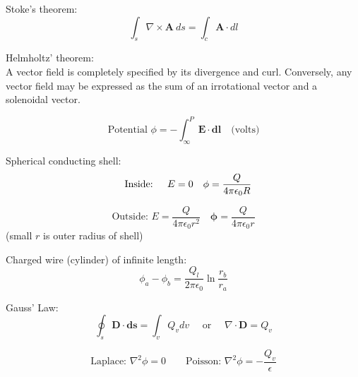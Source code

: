 \documentclass[a4paper]{article}
\begin{document}
{\large Stoke's theorem:}
\begin{displaymath}
\int_s \nabla \times \mathbf A \ ds = \int_c \mathbf A \cdot dl
\end{displaymath}


{\large Helmholtz' theorem: }\\
A vector field is completely specified by its divergence and
curl. Conversely, any vector field may be expressed as the sum of an
irrotational vector and a solenoidal vector.

\begin{displaymath}
\textrm{Potential }\phi = -
\int_\infty^P \mathbf E \cdot \mathbf{dl} \quad \textrm{(volts)}
\end{displaymath}

Spherical conducting shell: 
\begin{displaymath}
{}\nonumber\\
\quad 
\textrm{Inside: }
\quad
E=0
\quad
\phi=\frac Q {4 \pi \epsilon_0 R}
\end{displaymath}

\begin{displaymath}
\textrm{Outside: }
E= \frac Q {4 \pi \epsilon_0 r^2}
\quad
\mathbf \phi= \frac Q {4 \pi \epsilon_0 r}
\end{displaymath}
(small $r$ is outer radius of shell)


Charged wire (cylinder) of infinite length:
\begin{displaymath}
\phi_a-\phi_b=\frac{Q_l}{2\pi\epsilon_0} \ln \frac{r_b}{r_a}
\end{displaymath}

{\large Gauss' Law:}
\begin{displaymath}
\oint_s \mathbf {D\cdot ds} = \int_v Q_v dv
\quad
\textrm{ or }
\quad
\nabla\cdot\mathbf D=Q_v
\end{displaymath}

\begin{displaymath}
\textrm{Laplace: }
\nabla^2\phi=0
\qquad
\textrm{Poisson: }
\nabla^2\phi=-\frac{Q_v}{\epsilon}
\end{displaymath}
\end{document}
